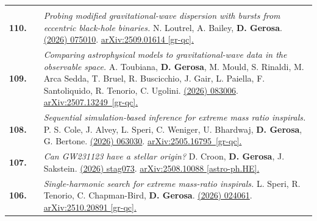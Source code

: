 {\begin{longtable}{rp{0.3cm}p{15.8cm}}
\vspace{0.09cm}\\
%
\textbf{110.} & & \textit{Probing modified gravitational-wave dispersion with bursts from eccentric black-hole binaries.}
\newline{}
N. Loutrel, A. Bailey, \textbf{D. Gerosa}.
\newline{}
\href{https://iopscience.iop.org/article/10.1088/1361-6382/ae59e4}{\cqg 43 (2026) 075010}. \href{https://arxiv.org/abs/2509.01614}{arXiv:2509.01614 [gr-qc].}
\vspace{0.09cm}\\
%
\textbf{109.} & & \textit{Comparing astrophysical models to gravitational-wave data in the observable space.}
\newline{}
A. Toubiana, \textbf{D. Gerosa}, M. Mould, S. Rinaldi, M. Arca Sedda, T. Bruel, R. Buscicchio, J. Gair, L. Paiella, F. Santoliquido, R. Tenorio, C. Ugolini.
\newline{}
\href{https://journals.aps.org/prd/abstract/10.1103/8xkp-zpj1}{\prd 113 (2026) 083006}. \href{https://arxiv.org/abs/2507.13249}{arXiv:2507.13249 [gr-qc].}
\vspace{0.09cm}\\
%
\textbf{108.} & & \textit{Sequential simulation-based inference for extreme mass ratio inspirals.}
\newline{}
P. S. Cole, J. Alvey, L. Speri, C. Weniger, U. Bhardwaj, \textbf{D. Gerosa}, G. Bertone.
\newline{}
\href{https://journals.aps.org/prd/abstract/10.1103/4cd3-wfjr}{\prd 113 (2026) 063030}. \href{https://arxiv.org/abs/2505.16795}{arXiv:2505.16795 [gr-qc].}
\vspace{0.09cm}\\
%
\textbf{107.} & & \textit{Can GW231123 have a stellar origin?}
\newline{}
D. Croon, \textbf{D. Gerosa}, J. Sakstein.
\newline{}
\href{https://academic.oup.com/mnras/article/doi/10.1093/mnras/stag073/8431335}{\mnras 546 (2026) stag073}. \href{https://arxiv.org/abs/2508.10088}{arXiv:2508.10088 [astro-ph.HE].}
\vspace{0.09cm}\\
%
\textbf{106.} & & \textit{Single-harmonic search for extreme mass-ratio inspirals.}
\newline{}
L. Speri, R. Tenorio, C. Chapman-Bird, \textbf{D. Gerosa}.
\newline{}
\href{https://journals.aps.org/prd/abstract/10.1103/dh3j-ksfl}{\prd 113 (2026) 024061}. \href{https://arxiv.org/abs/2510.20891}{arXiv:2510.20891 [gr-qc].}

\end{longtable}}
